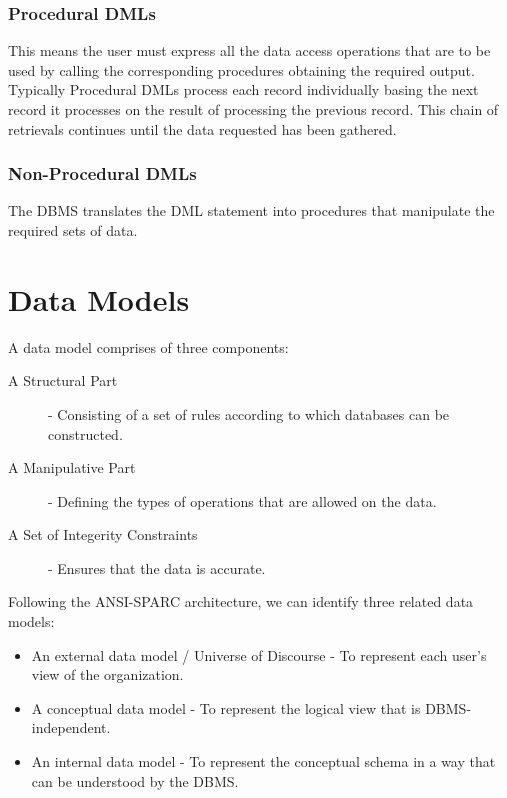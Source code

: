 \documentclass[12pt letter]{report}
\begin{document}
\subsubsection{Procedural DMLs}

This means the user must express all the data access operations that are to be used by calling the corresponding
procedures obtaining the required output. Typically Procedural DMLs process each record individually basing the next
record it processes on the result of processing the previous record. This chain of retrievals continues until the data
requested has been gathered.

\subsubsection{Non-Procedural DMLs}


The DBMS translates the DML statement into procedures that manipulate the required sets of data.

\section{Data Models}

A data model comprises of three components:
\begin{description}
  \item[A Structural Part] - Consisting of a set of rules according to which databases can be constructed.
  \item[A Manipulative Part] - Defining the types of operations that are allowed on the data.
  \item[A Set of Integerity Constraints] - Ensures that the data is accurate.
\end{description}

Following the ANSI-SPARC architecture, we can identify three related data models:
\begin{itemize}
  \item An external data model / Universe of Discourse - To represent each user's view of the organization.
  \item A conceptual data model - To represent the logical view that is DBMS-independent.
  \item An internal data model - To represent the conceptual schema in a way that can be understood by the DBMS.

\end{itemize}
\end{document}
